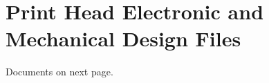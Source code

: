 \chapter{Print Head Electronic and Mechanical Design Files}
\label{app:print_head_electronic_mechanical_design_files}

Documents on next page.